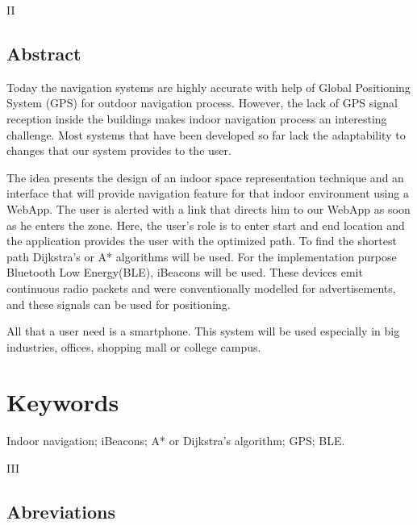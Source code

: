 ﻿\documentclass[a4paper, 12pt]{article}
\begin{document}
\newpage
\begin{center}
    II
\end{center}
\begin{center}
    \section*{Abstract}
\end{center}
Today the navigation systems are highly accurate with help of Global Positioning System (GPS) for outdoor navigation process. However, the lack of GPS signal reception inside the buildings makes indoor navigation process an interesting challenge. Most systems that have been developed so far lack the adaptability to changes that our system provides to the user. 
\par 
The idea presents the design of an indoor space representation technique and an interface that will provide navigation feature for that indoor environment using a WebApp. The user is alerted with a link that directs him to our WebApp as soon as he enters the zone. Here, the user’s role is to enter start and end location and the application provides the user with the optimized path. To find the shortest path Dijkstra’s or A* algorithms will be used. For the implementation purpose Bluetooth Low Energy(BLE), iBeacons will be used. These devices emit continuous radio packets and were conventionally modelled for advertisements, and these signals can be used for positioning. 
\par
All that a user need is a smartphone. This system will be used especially in big industries, offices, shopping mall or college campus.
\linebreak
\section*{Keywords}
Indoor navigation; iBeacons; A* or Dijkstra’s algorithm; GPS; BLE.
\newpage
\begin{center}
    III
\end{center}
\begin{center}
    \section*{Abreviations}
\end{center}
\end{document}
